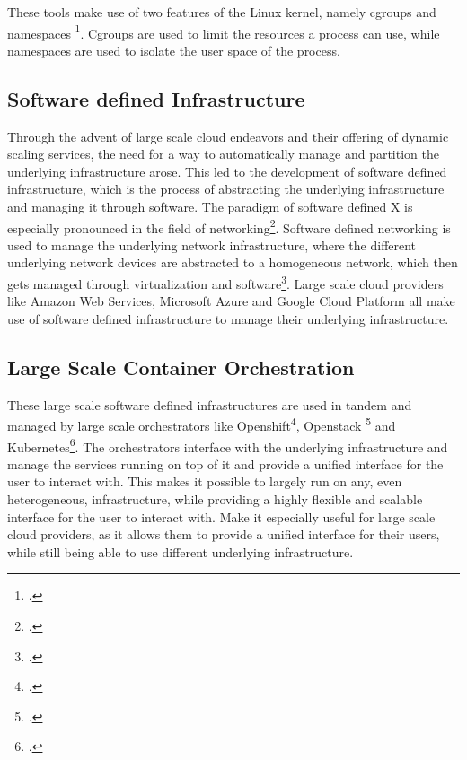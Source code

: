 These tools make use of two features of the Linux kernel, namely cgroups and namespaces \footcite{WhatContainerDocker}.
Cgroups are used to limit the resources a process can use, while namespaces are used to isolate the user space of the process.

\subsection*{Software defined Infrastructure}

Through the advent of large scale cloud endeavors and their offering of dynamic scaling services, the need for a way to automatically manage and partition the underlying infrastructure arose.
This led to the development of software defined infrastructure, which is the process of abstracting the underlying infrastructure and managing it through software.
The paradigm of software defined X is especially pronounced in the field of networking\footcite{xiaSurveySoftwareDefinedNetworking2015}.
Software defined networking is used to manage the underlying network infrastructure,
where the different underlying network devices are abstracted to a homogeneous network, which then gets managed through virtualization and software\footcite{baurCloudOrchestrationFeatures2015}.
Large scale cloud providers like Amazon Web Services, Microsoft Azure and Google Cloud Platform all make use of software defined infrastructure to manage their underlying infrastructure.

\subsection*{Large Scale Container Orchestration}

These large scale software defined infrastructures are used in tandem and managed by large scale orchestrators like Openshift\footcite{RedHatOpenShift}, Openstack \footcite{OpenSourceCloud} and Kubernetes\footcite{ProductionGradeContainerOrchestration}. 
The orchestrators interface with the underlying infrastructure and manage the services running on top of it and provide a unified interface for the user to interact with.
This makes it possible to largely run on any, even heterogeneous, infrastructure, while providing a highly flexible and scalable interface for the user to interact with.
Make it especially useful for large scale cloud providers, as it allows them to provide a unified interface for their users, while still being able to use different underlying infrastructure.

